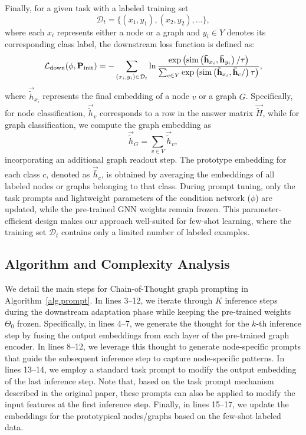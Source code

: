 Finally, for a given task with a labeled training set 
\[
\mathcal{D}_t = \{(x_1, y_1), (x_2, y_2), \dots\},
\]
where each \( x_i \) represents either a node or a graph and \( y_i \in Y \) denotes its corresponding class label, the downstream loss function is defined as:
\begin{align}\label{eq.prompt-loss}
    \mathcal{L}_{\text{down}}(\phi,\mathbf{P}_\text{init}) = -\sum_{(x_i, y_i) \in \mathcal{D}_t} \ln \frac{\exp\left(\text{sim}\left(\mathbf{\tilde{h}}_{x_i}, \mathbf{\bar{h}}_{y_i}\right)/\tau\right)}{\sum_{c \in Y} \exp\left( \text{sim}\left(\mathbf{\tilde{h}}_{x_i}, \mathbf{\bar{h}}_{c}/\right)\tau\right)},
\end{align}
where \( \vec{\tilde{h}}_{x_i} \) represents the final embedding of a node \( v \) or a graph \( G \). Specifically, for node classification, \( \vec{\tilde{h}}_{v} \) corresponds to a row in the answer matrix \( \vec{\tilde{H}} \), while for graph classification, we compute the graph embedding as
\[
    \vec{\tilde{h}}_{G} = \sum_{v \in V} \vec{\tilde{h}}_{v},
\]
incorporating an additional graph readout step.
The prototype embedding for each class \( c \), denoted as \( \vec{\bar{h}}_{c} \), is obtained by averaging the embeddings of all labeled nodes or graphs belonging to that class.
During prompt tuning, only the task prompts and lightweight parameters of the condition network (\( \phi \)) are updated, while the pre-trained GNN weights remain frozen. This parameter-efficient design makes our approach well-suited for few-shot learning, where the training set \( \mathcal{D}_t \) contains only a limited number of labeled examples.

\subsection{Algorithm and Complexity Analysis}
We detail the main steps for Chain-of-Thought graph prompting in Algorithm~\ref{alg.prompt}. In lines 3--12, we iterate through \( K \) inference steps during the downstream adaptation phase while keeping the pre-trained weights \( \Theta_0 \) frozen. Specifically, in lines 4--7, we generate the thought for the \( k \)-th inference step by fusing the output embeddings from each layer of the pre-trained graph encoder. In lines 8--12, we leverage this thought to generate node-specific prompts that guide the subsequent inference step to capture node-specific patterns. In lines 13--14, we employ a standard task prompt to modify the output embedding of the last inference step. Note that, based on the task prompt mechanism described in the original paper, these prompts can also be applied to modify the input features at the first inference step. Finally, in lines 15--17, we update the embeddings for the prototypical nodes/graphs based on the few-shot labeled data.


